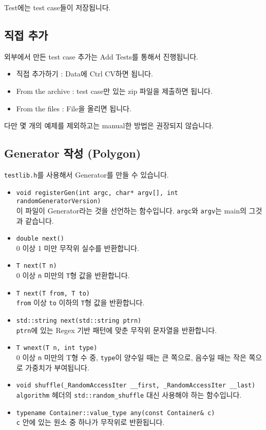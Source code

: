 \documentclass{article}
\begin{document}
    Test에는 test case들이 저장됩니다.
    \subsection{직접 추가}
    외부에서 만든 test case 추가는 Add Tests를 통해서 진행됩니다. 
    \begin{itemize}
        \item 직접 추가하기 : Data에 Ctrl CV하면 됩니다.
        \item From the archive : test case만 있는 zip 파일을 제출하면 됩니다.
        \item From the files : File을 올리면 됩니다.
    \end{itemize}
    다만 몇 개의 예제를 제외하고는 manual한 방법은 권장되지 않습니다.
    \subsection{Generator 작성 (Polygon)}
    \verb|testlib.h|를 사용해서 Generator를 만들 수 있습니다. 
    \begin{itemize}
        \item \verb|void registerGen(int argc, char* argv[], int randomGeneratorVersion)|\\
        이 파일이 Generator라는 것을 선언하는 함수입니다. \verb|argc|와 \verb|argv|는 main의 그것과 같습니다.
        \item \verb|double next()|\\
        0 이상 1 미만 무작위 실수를 반환합니다.
        \item \verb|T next(T n)|\\
        0 이상 \verb|n| 미만의 \verb|T|형 값을 반환합니다.
        \item \verb|T next(T from, T to)|\\
        \verb|from| 이상 \verb|to| 이하의 \verb|T|형 값을 반환합니다.
        \item \verb|std::string next(std::string ptrn)|\\
        \verb|ptrn|에 있는 Regex 기반 패턴에 맞춘 무작위 문자열을 반환합니다.
        \item \verb|T wnext(T n, int type)|\\
        0 이상 \verb|n| 미만의 T형 수 중, \verb|type|이 양수일 때는 큰 쪽으로, 음수일 때는 작은 쪽으로 가중치가 부여됩니다.
        \item \verb|void shuffle(_RandomAccessIter __first, _RandomAccessIter __last)|\\
        \verb|algorithm| 헤더의 \verb|std::random_shuffle| 대신 사용해야 하는 함수입니다.
        \item \verb|typename Container::value_type any(const Container& c)|\\
        \verb|c| 안에 있는 원소 중 하나가 무작위로 반환됩니다.
    \end{itemize}
\end{document}
